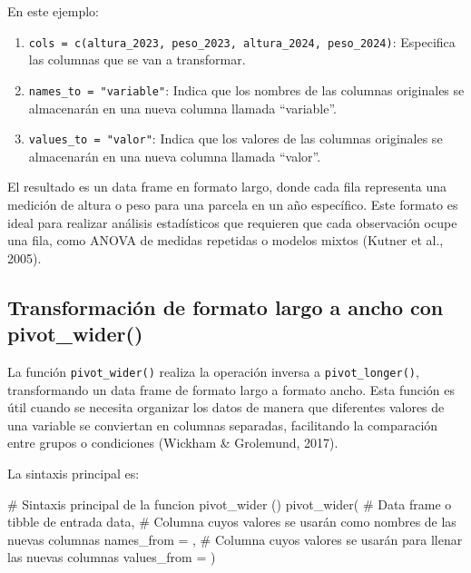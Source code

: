 \documentclass[
  spanish,
  a4paper,
  DIV=11,
  numbers=noendperiod,
  onepage,
  openany]{scrreprt}
\newenvironment{Shaded}{\begin{snugshade}}{\end{snugshade}}
\newcommand{\AttributeTok}[1]{\textcolor[rgb]{0.40,0.45,0.13}{#1}}
\newcommand{\CommentTok}[1]{\textcolor[rgb]{0.37,0.37,0.37}{#1}}
\newcommand{\FunctionTok}[1]{\textcolor[rgb]{0.28,0.35,0.67}{#1}}
\newcommand{\NormalTok}[1]{\textcolor[rgb]{0.00,0.23,0.31}{#1}}
\begin{document}
En este ejemplo:

\begin{enumerate}
\def\labelenumi{\arabic{enumi}.}
\item
  \texttt{cols\ =\ c(altura\_2023,\ peso\_2023,\ altura\_2024,\ peso\_2024)}:
  Especifica las columnas que se van a transformar.
\item
  \texttt{names\_to\ =\ "variable"}: Indica que los nombres de las
  columnas originales se almacenarán en una nueva columna llamada
  ``variable''.
\item
  \texttt{values\_to\ =\ "valor"}: Indica que los valores de las
  columnas originales se almacenarán en una nueva columna llamada
  ``valor''.
\end{enumerate}

El resultado es un data frame en formato largo, donde cada fila
representa una medición de altura o peso para una parcela en un año
específico. Este formato es ideal para realizar análisis estadísticos
que requieren que cada observación ocupe una fila, como ANOVA de medidas
repetidas o modelos mixtos (Kutner et al., 2005).

\subsection{Transformación de formato largo a ancho con
pivot\_wider()}\label{transformaciuxf3n-de-formato-largo-a-ancho-con-pivot_wider}

La función \texttt{pivot\_wider()} realiza la operación inversa a
\texttt{pivot\_longer()}, transformando un data frame de formato largo a
formato ancho. Esta función es útil cuando se necesita organizar los
datos de manera que diferentes valores de una variable se conviertan en
columnas separadas, facilitando la comparación entre grupos o
condiciones (Wickham \& Grolemund, 2017).

La sintaxis principal es:

\begin{Shaded}
\begin{Highlighting}[]
\CommentTok{\# Sintaxis principal de la funcion pivot\_wider ()}
\FunctionTok{pivot\_wider}\NormalTok{(}
  \CommentTok{\# Data frame o tibble de entrada}
\NormalTok{  data,              }
  \CommentTok{\# Columna cuyos valores se usarán como nombres de las nuevas columnas}
  \AttributeTok{names\_from =}\NormalTok{ , }
  \CommentTok{\# Columna cuyos valores se usarán para llenar las nuevas columnas}
  \AttributeTok{values\_from =}        
\NormalTok{)}
\end{Highlighting}
\end{Shaded}
\end{document}
